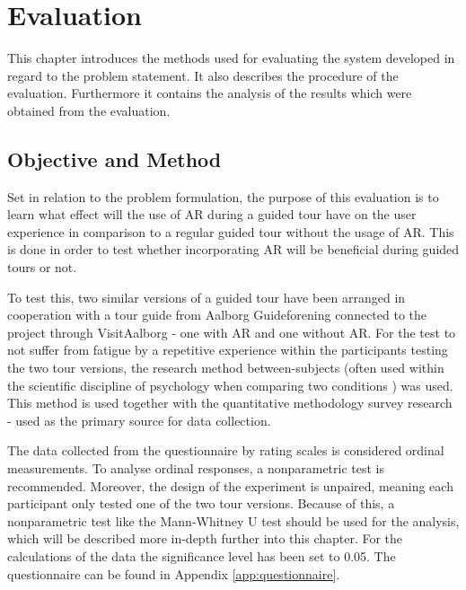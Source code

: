 \chapter{Evaluation}\label{ch:evaluation}
This chapter introduces the methods used for evaluating the system developed in regard to the problem statement. It also describes the procedure of the evaluation. Furthermore it contains the analysis of the results which were obtained from the evaluation.

\section{Objective and Method} 
Set in relation to the problem formulation, the purpose of this evaluation is to learn what effect will the use of AR during a guided tour have on the user experience in comparison to a regular guided tour without the usage of AR. This is done in order to test whether incorporating AR will be beneficial during guided tours or not. 

To test this, two similar versions of a guided tour have been arranged in cooperation with a tour guide from Aalborg Guideforening connected to the project through VisitAalborg - one with AR and one without AR. For the test to not suffer from fatigue by a repetitive experience within the participants testing the two tour versions, the research method between-subjects (often used within the scientific discipline of psychology when comparing two conditions \cite{Charness2012}) was used. This method is used together with the quantitative methodology survey research - used as the primary source for data collection.

The data collected from the questionnaire by rating scales is considered ordinal measurements. To analyse ordinal responses, a nonparametric test is recommended. Moreover, the design of the experiment is unpaired, meaning each participant only tested one of the two tour versions. Because of this, a nonparametric test like the Mann-Whitney U test should be used for the analysis, which will be described more in-depth further into this chapter. For the calculations of the data the significance level has been set to 0.05. The questionnaire can be found in Appendix \ref{app:questionnaire}.

